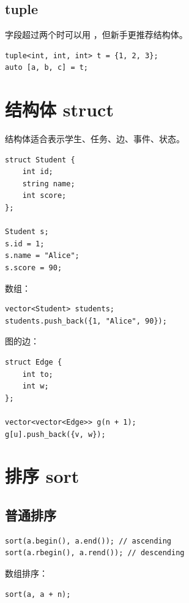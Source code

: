 \subsection{tuple}

字段超过两个时可以用 ，但新手更推荐结构体。

\begin{lstlisting}
tuple<int, int, int> t = {1, 2, 3};
auto [a, b, c] = t;
\end{lstlisting}

\section{结构体 struct}\label{sec:04-14}

结构体适合表示学生、任务、边、事件、状态。

\begin{lstlisting}
struct Student {
    int id;
    string name;
    int score;
};

Student s;
s.id = 1;
s.name = "Alice";
s.score = 90;
\end{lstlisting}

数组：

\begin{lstlisting}
vector<Student> students;
students.push_back({1, "Alice", 90});
\end{lstlisting}

图的边：

\begin{lstlisting}
struct Edge {
    int to;
    int w;
};

vector<vector<Edge>> g(n + 1);
g[u].push_back({v, w});
\end{lstlisting}

\section{排序 sort}\label{sec:04-15}

\subsection{普通排序}

\begin{lstlisting}
sort(a.begin(), a.end()); // ascending
sort(a.rbegin(), a.rend()); // descending
\end{lstlisting}

数组排序：

\begin{lstlisting}
sort(a, a + n);
\end{lstlisting}


